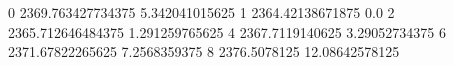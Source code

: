 0 2369.763427734375 5.342041015625
1 2364.42138671875 0.0
2 2365.712646484375 1.291259765625
4 2367.7119140625 3.29052734375
6 2371.67822265625 7.2568359375
8 2376.5078125 12.08642578125

